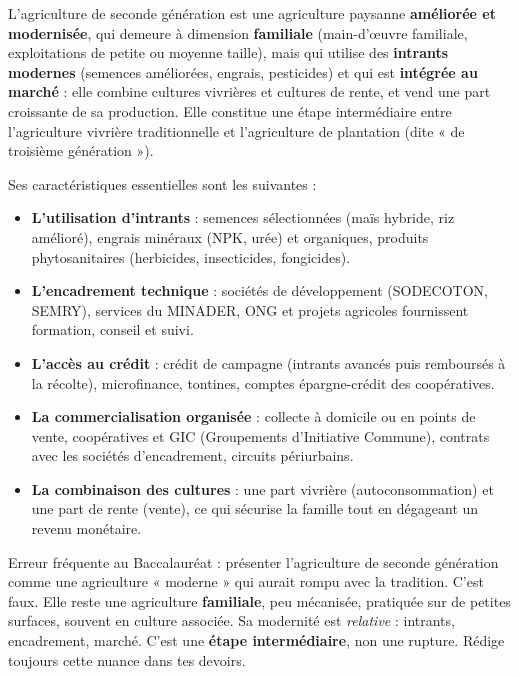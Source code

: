 \documentclass[11pt]{article}
\newcommand{\cle}[1]{{\popxbold\color{popdark}#1}}
\begin{document}
\begin{definition}
L'\cle{agriculture de seconde génération} est une agriculture paysanne \textbf{améliorée et modernisée}, qui demeure à dimension \textbf{familiale} (main-d'œuvre familiale, exploitations de petite ou moyenne taille), mais qui utilise des \textbf{intrants modernes} (semences améliorées, engrais, pesticides) et qui est \textbf{intégrée au marché} : elle combine cultures vivrières et cultures de rente, et vend une part croissante de sa production. Elle constitue une étape intermédiaire entre l'agriculture vivrière traditionnelle et l'agriculture de plantation (dite « de troisième génération »).
\end{definition}

Ses caractéristiques essentielles sont les suivantes :

\begin{itemize}
\item \textbf{L'utilisation d'intrants} : semences sélectionnées (maïs hybride, riz amélioré), engrais minéraux (NPK, urée) et organiques, produits phytosanitaires (herbicides, insecticides, fongicides).
\item \textbf{L'encadrement technique} : sociétés de développement (SODECOTON, SEMRY), services du MINADER, ONG et projets agricoles fournissent formation, conseil et suivi.
\item \textbf{L'accès au crédit} : crédit de campagne (intrants avancés puis remboursés à la récolte), microfinance, tontines, comptes épargne-crédit des coopératives.
\item \textbf{La commercialisation organisée} : collecte à domicile ou en points de vente, coopératives et GIC (Groupements d'Initiative Commune), contrats avec les sociétés d'encadrement, circuits périurbains.
\item \textbf{La combinaison des cultures} : une part vivrière (autoconsommation) et une part de rente (vente), ce qui sécurise la famille tout en dégageant un revenu monétaire.
\end{itemize}

\begin{attention}
Erreur fréquente au Baccalauréat : présenter l'agriculture de seconde génération comme une agriculture « moderne » qui aurait rompu avec la tradition. C'est faux. Elle reste une agriculture \textbf{familiale}, peu mécanisée, pratiquée sur de petites surfaces, souvent en culture associée. Sa modernité est \emph{relative} : intrants, encadrement, marché. C'est une \textbf{étape intermédiaire}, non une rupture. Rédige toujours cette nuance dans tes devoirs.
\end{attention}
\end{document}
